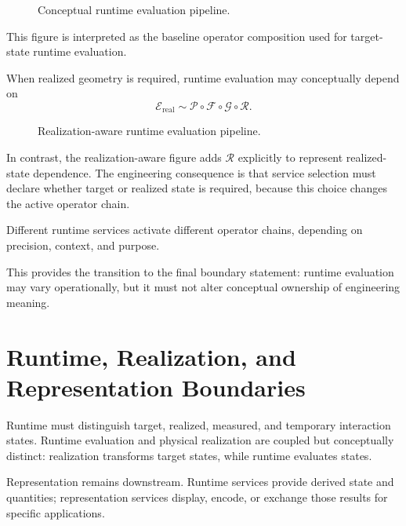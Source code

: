 \begin{figure}[ht]
\centering

\caption{Conceptual runtime evaluation pipeline.}
\label{fig:runtime-pipeline}
\end{figure}

This figure is interpreted as the baseline operator composition used for
target-state runtime evaluation.

\begin{definition}
\label{def:realized-runtime-pipeline}
When realized geometry is required, runtime evaluation may conceptually
depend on
\[
\mathcal E_{\mathrm{real}}
\sim
\mathcal P
\circ
\mathcal F
\circ
\mathcal G
\circ
\mathcal R.
\]
\end{definition}

\begin{figure}[ht]
\centering

\caption{Realization-aware runtime evaluation pipeline.}
\label{fig:realization-pipeline}
\end{figure}

In contrast, the realization-aware figure adds \(\mathcal R\) explicitly
to represent realized-state dependence. The engineering consequence is
that service selection must declare whether target or realized state is
required, because this choice changes the active operator chain.

Different runtime services activate different operator chains, depending
on precision, context, and purpose.

This provides the transition to the final boundary statement: runtime
evaluation may vary operationally, but it must not alter conceptual
ownership of engineering meaning.

\section{Runtime, Realization, and Representation Boundaries}

Runtime must distinguish target, realized, measured, and temporary
interaction states. Runtime evaluation and physical realization are
coupled but conceptually distinct: realization transforms target states,
while runtime evaluates states.

Representation remains downstream. Runtime services provide derived
state and quantities; representation services display, encode, or
exchange those results for specific applications.

